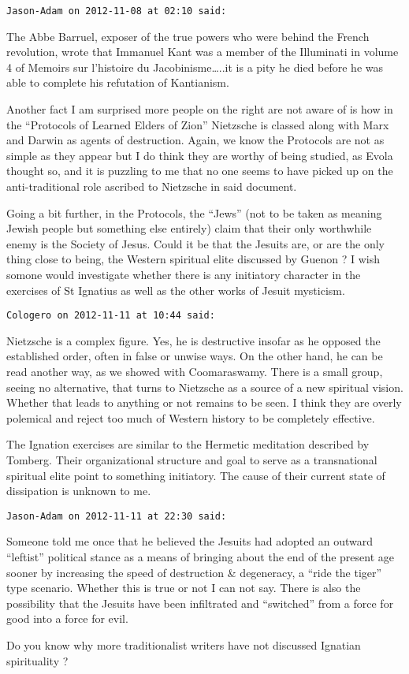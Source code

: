 \begin{footnotesize}
\begin{sffamily}
\hfill

\texttt{Jason-Adam on 2012-11-08 at 02:10 said: }

The Abbe Barruel, exposer of the true powers who were behind the French revolution, wrote that Immanuel Kant was a
member of the Illuminati in volume 4 of Memoirs sur l'histoire du Jacobinisme…..it is a pity he died before
he was able to complete his refutation of Kantianism.

Another fact I am surprised more people on the right are not aware of is how in the “Protocols of Learned Elders of
Zion” Nietzsche is classed along with Marx and Darwin as agents of destruction. Again, we know the Protocols are not as
simple as they appear but I do think they are worthy of being studied, as Evola thought so, and it is puzzling to me
that no one seems to have picked up on the anti-traditional role ascribed to Nietzsche in said document.

Going a bit further, in the Protocols, the “Jews” (not to be taken as meaning Jewish people but something else entirely)
claim that their only worthwhile enemy is the Society of Jesus. Could it be that the Jesuits are, or are the only thing
close to being, the Western spiritual elite discussed by Guenon ? I wish somone would investigate whether there is any
initiatory character in the exercises of St Ignatius as well as the other works of Jesuit mysticism.

\hfill

\texttt{Cologero on 2012-11-11 at 10:44 said: }

Nietzsche is a complex figure. Yes, he is destructive insofar as he opposed the established order, often in false or
unwise ways. On the other hand, he can be read another way, as we showed with Coomaraswamy. There is a small group,
seeing no alternative, that turns to Nietzsche as a source of a new spiritual vision. Whether that leads to anything or
not remains to be seen. I think they are overly polemical and reject too much of Western history to be completely
effective.

The Ignation exercises are similar to the Hermetic meditation described by Tomberg. Their organizational structure and
goal to serve as a transnational spiritual elite point to something initiatory. The cause of their current state of
dissipation is unknown to me.

\hfill

\texttt{Jason-Adam on 2012-11-11 at 22:30 said: }

Someone told me once that he believed the Jesuits had adopted an outward “leftist” political stance as a means of
bringing about the end of the present age sooner by increasing the speed of destruction \& degeneracy, a “ride the
tiger” type scenario. Whether this is true or not I can not say. There is also the possibility that the Jesuits have
been infiltrated and “switched” from a force for good into a force for evil.

Do you know why more traditionalist writers have not discussed Ignatian spirituality ?

\hfill

\end{sffamily}\end{footnotesize}
